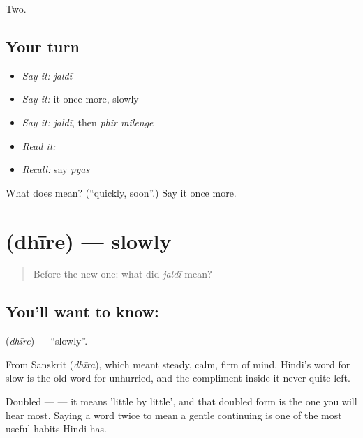 \begin{grammarlens}[title={What you've built}]
Two.
\end{grammarlens}

\subsection*{Your turn}
\begin{itemize}
\raggedright
  \item \emph{Say it:} \emph{jaldī}
  \item \emph{Say it:} it once more, slowly
  \item \emph{Say it:} \emph{jaldī}, then \emph{phir milenge}
  \item \emph{Read it:} \textbf{}
  \item \emph{Recall:} say \emph{pyās}
\end{itemize}

\begin{tcolorbox}[breakable,colback=teal!4,colframe=teal!35!black,title={Before you move on}]
What does  mean? (\textquotedblleft{}quickly, soon\textquotedblright{}.) Say it once more.
\end{tcolorbox}
\section[\texorpdfstring{\hi{धीरे} (dhīre)}{धीरे (dhīre)}]{ (dhīre) — slowly}

\label{lesson:HI-C64-slowly}



\begin{quote}
Before the new one: what did \emph{jaldī} mean?
\end{quote}

\subsection*{You'll want to know: }
\textbf{} (\emph{dhīre}) — \textquotedblleft{}slowly\textquotedblright{}.

From Sanskrit  (\emph{dhīra}), which meant steady, calm, firm of mind. Hindi's word for slow is the old word for unhurried, and the compliment inside it never quite left.

Doubled —   — it means 'little by little', and that doubled form is the one you will hear most. Saying a word twice to mean a gentle continuing is one of the most useful habits Hindi has.

